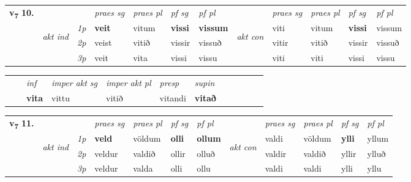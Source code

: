 \begin{tabular}{llllllllllll} \toprule
\multirow{4}{*}{{{\textbf{v{\textsubscript{7}}} \Large{\textbf{10.}}}}}  & &   &  \textit{praes sg}  & \textit{praes pl}  &\textit{ pf sg} & \textit{pf pl} &  &  \textit{praes sg}  & \textit{praes pl}  & \textit{pf sg} & \textit{pf pl } \\*
	\cmidrule{4-7} \cmidrule{9-12}
 & \multirow{3}{*}{\begin{turn}{90}\textit{akt ind}\end{turn}} & {\textit{1p}} & \textbf{veit} & vitum    & \textbf{vissi} & \textbf{vissum} & \multirow{3}{*}{\begin{turn}{90}\textit{akt con}\end{turn}} &viti & vitum & \textbf{vissi} & vissum\\*
& &  {\textit{2p}} &  veist  & vitið   & vissir & vissuð & & vitir & vitið & vissir & vissuð \\*
& &  {\textit{3p}} & veit & vita   & vissi & vissu & & viti & viti& vissi & vissu  \\*
\cmidrule{4-7} \cmidrule{9-12}
\end{tabular}


\begin{tabular}{llllllllllll}
 & & \textit{inf} & \textit{imper akt sg} & \textit{imper akt pl}   & \textit{presp} & \textit{supin}       \\*
  & & \textbf{vita} & vittu  & vitið   & vitandi &  \textbf{vitað}   \\*
\cmidrule{1-12}
\end{tabular}



\begin{tabular}{llllllllllll} \toprule
\multirow{4}{*}{{{\textbf{v{\textsubscript{7}}} \Large{\textbf{11.}}}}}  & &   &  \textit{praes sg}  & \textit{praes pl}  &\textit{ pf sg} & \textit{pf pl} &  &  \textit{praes sg}  & \textit{praes pl}  & \textit{pf sg} & \textit{pf pl } \\*
	\cmidrule{4-7} \cmidrule{9-12}
 & \multirow{3}{*}{\begin{turn}{90}\textit{akt ind}\end{turn}} & {\textit{1p}} & \textbf{veld} & völdum    & \textbf{olli} & \textbf{ollum} & \multirow{3}{*}{\begin{turn}{90}\textit{akt con}\end{turn}} &valdi & völdum & \textbf{ylli} & yllum\\*
& &  {\textit{2p}} &  veldur  & valdið   & ollir & olluð & & valdir & valdið & yllir & ylluð \\*
& &  {\textit{3p}} & veldur & valda   & olli & ollu & & valdi & valdi& ylli & yllu  \\*
\cmidrule{4-7} \cmidrule{9-12}
\end{tabular}


